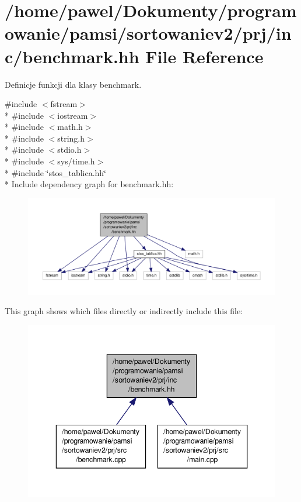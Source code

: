 \hypertarget{benchmark_8hh}{\section{/home/pawel/\-Dokumenty/programowanie/pamsi/sortowaniev2/prj/inc/benchmark.hh File Reference}
\label{benchmark_8hh}
}


Definicje funkcji dla klasy benchmark.  


{\ttfamily \#include $<$fstream$>$}\\*
{\ttfamily \#include $<$iostream$>$}\\*
{\ttfamily \#include $<$math.\-h$>$}\\*
{\ttfamily \#include $<$string.\-h$>$}\\*
{\ttfamily \#include $<$stdio.\-h$>$}\\*
{\ttfamily \#include $<$sys/time.\-h$>$}\\*
{\ttfamily \#include \char`\"{}stos\-\_\-tablica.\-hh\char`\"{}}\\*
Include dependency graph for benchmark.\-hh\-:\nopagebreak
\begin{figure}[H]
\begin{center}
\leavevmode
\includegraphics[width=350pt]{benchmark_8hh__incl}
\end{center}
\end{figure}
This graph shows which files directly or indirectly include this file\-:\nopagebreak
\begin{figure}[H]
\begin{center}
\leavevmode
\includegraphics[width=346pt]{benchmark_8hh__dep__incl}
\end{center}
\end{figure}
